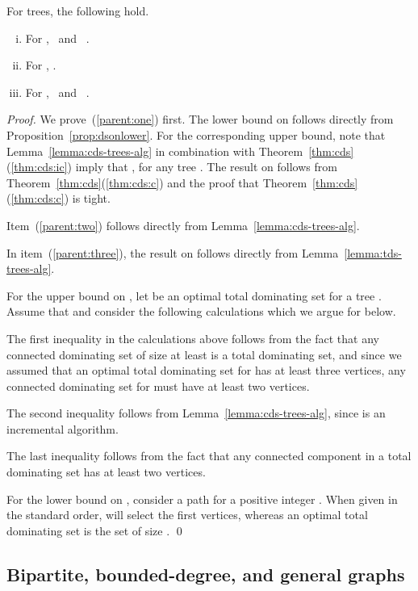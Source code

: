 \begin{proposition}
\label{prop:parent}
For trees, the following hold.
\begin{enumerate}[(i)]
\item \label{parent:one}
For \ds,  \, and \, .
\item \label{parent:two}
For \cds, . 
\item \label{parent:three}
For \tds,  \, and \, .
\end{enumerate}
\end{proposition}
\begin{proof}
We prove~(\ref{parent:one}) first.
The lower bound on  follows directly from
Proposition~\ref{prop:dsonlower}.
For the corresponding upper bound, note that
Lemma~\ref{lemma:cds-trees-alg} in combination with
Theorem~\ref{thm:cds}(\ref{thm:cds:ic}) 
imply that 
,
for any tree . 
The result on  follows from
Theorem~\ref{thm:cds}(\ref{thm:cds:c}) and the proof that
Theorem~\ref{thm:cds}(\ref{thm:cds:c}) is tight. 

Item~(\ref{parent:two}) follows directly from Lemma~\ref{lemma:cds-trees-alg}.

In item~(\ref{parent:three}),
the result on  follows directly from
Lemma~\ref{lemma:tds-trees-alg}.

For the upper bound on , let  be an optimal total
dominating set for a tree . Assume that  and consider
the following calculations which we argue for below.

The first inequality in the calculations above follows from the fact
that any connected dominating set of size at least  is a total
dominating set, and since we assumed that an optimal total dominating set
for  has at least three vertices, any connected dominating set for
 must have at least two vertices.

The second inequality follows from Lemma~\ref{lemma:cds-trees-alg},
since \aparent is an incremental algorithm.

The last inequality follows from the fact that any connected component
in a total dominating set has at least two vertices.

For the lower bound on , consider a path  for a positive integer .
When given in the standard order, \aparent will select the first 
vertices, whereas an optimal total dominating set is the set  of size .
\qed\end{proof}


\subsection{Bipartite, bounded-degree, and general graphs}

